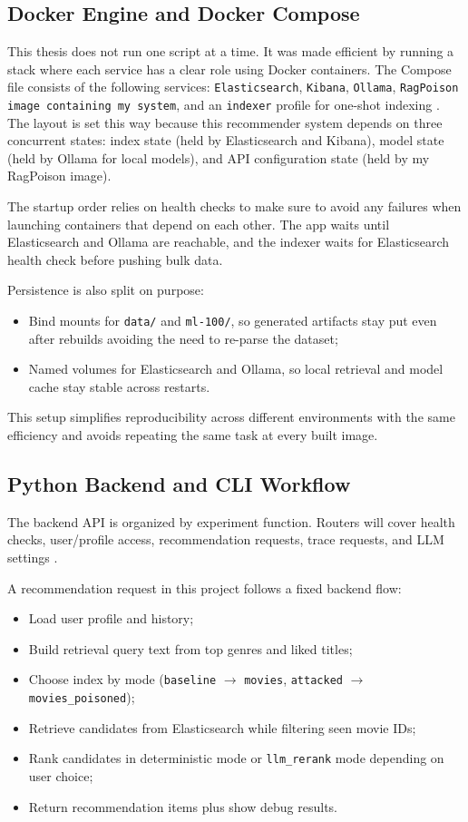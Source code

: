 \subsection{Docker Engine and Docker Compose}

This thesis does not run one script at a time. It was made efficient by running a stack where each service has a clear role using Docker containers. The Compose file consists of the following services: \texttt{Elasticsearch}, \texttt{Kibana}, \texttt{Ollama}, \texttt{RagPoison image containing my system}, and an \texttt{indexer} profile for one-shot indexing \cite{ragpoisonlab_repo}. The layout is set this way because this recommender system depends on three concurrent states: index state (held by Elasticsearch and Kibana), model state (held by Ollama for local models), and API configuration state (held by my RagPoison image).

The startup order relies on health checks to make sure to avoid any failures when launching containers that depend on each other. The app waits until Elasticsearch and Ollama are reachable, and the indexer waits for Elasticsearch health check before pushing bulk data.

Persistence is also split on purpose:
\begin{itemize}
  \item Bind mounts for \texttt{data/} and \texttt{ml-100/}, so generated artifacts stay put even after rebuilds avoiding the need to re-parse the dataset;
  \item Named volumes for Elasticsearch and Ollama, so local retrieval and model cache stay stable across restarts.
\end{itemize}
This setup simplifies reproducibility across different environments with the same efficiency and avoids repeating the same task at every built image.

\subsection{Python Backend and CLI Workflow}

The backend API is organized by experiment function. Routers will cover health checks, user/profile access, recommendation requests, trace requests, and LLM settings \cite{ragpoisonlab_repo}.

A recommendation request in this project follows a fixed backend flow:
\begin{itemize}
  \item Load user profile and history;
  \item Build retrieval query text from top genres and liked titles;
  \item Choose index by mode (\texttt{baseline} $\rightarrow$ \texttt{movies}, \texttt{attacked} $\rightarrow$ \texttt{movies\_poisoned});
  \item Retrieve candidates from Elasticsearch while filtering seen movie IDs;
  \item Rank candidates in deterministic mode or \texttt{llm\_rerank} mode depending on user choice;
  \item Return recommendation items plus show debug results.
\end{itemize}

